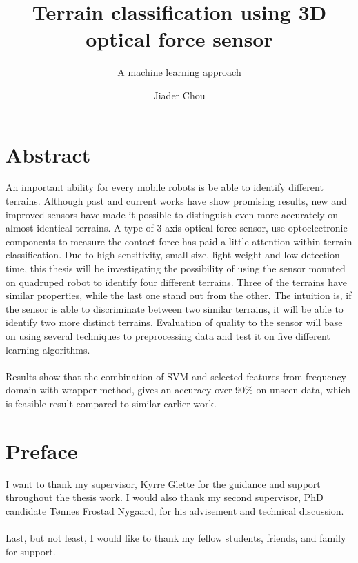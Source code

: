 \documentclass[USenglish]{ifimaster}  %
\title{Terrain classification using 3D optical force sensor}        %
\subtitle{A machine learning approach}
\author{Jiader Chou}                      %
\begin{document}
	\ififorside{}
	\frontmatter{}
	\maketitle{}
	
	\frontmatter{}
\chapter*{Abstract}                   %
An important ability for every mobile robots is be able to identify different terrains. Although past and current works have show promising results, new and improved sensors have made it possible to distinguish even more accurately on almost identical terrains. A type of 3-axis optical force sensor, use optoelectronic components to measure the contact force has paid a little attention within terrain classification. Due to high sensitivity, small size, 	light weight and low detection time, this thesis will be investigating the possibility of using the sensor mounted on quadruped robot to identify four different terrains. Three of the terrains have similar properties, while the last one stand out from the other. The intuition is, if the sensor is able to discriminate between two similar terrains, it will be able to identify two more distinct terrains. Evaluation of quality to the sensor will base on using several techniques to preprocessing data and test it on five different learning algorithms.
\\
\\
Results show that the combination of SVM and selected features from frequency domain with wrapper method, gives an accuracy over 90\% on unseen data, which is feasible result compared to similar earlier work.
	

	
\tableofcontents{}
\listoffigures{}
\listoftables{}
	
\chapter*{Preface}                    %
I want to thank my supervisor, Kyrre Glette for the guidance and support throughout the thesis work. I would also thank my second supervisor, PhD candidate Tønnes Frostad Nygaard, for his advisement and technical discussion.
\\
\\
Last, but not least, I would like to thank my fellow students, friends, and family for support.
	
\end{document}
